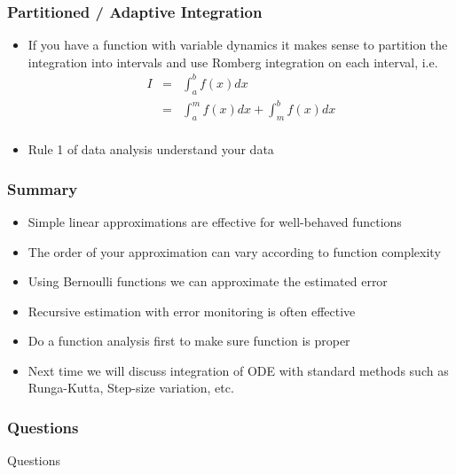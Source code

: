 \documentclass[10pt]{beamer}
\begin{document}
\begin{frame}
  \frametitle{Partitioned / Adaptive Integration}
  \begin{itemize}
  \item If you have a function with variable dynamics it makes sense
    to partition the integration into intervals and use Romberg
    integration on each interval, i.e.
    \[
      \begin{array}{rcl}
        I & = & \int_a^b f(x) dx \\
          & = & \int_a^m f(x) dx + \int_m^b f(x) dx\\
      \end{array}
    \]
  \item Rule 1 of data analysis understand your data     
  \end{itemize}
\end{frame}

\begin{frame}
  \frametitle{Summary}
  \begin{itemize}
  \item Simple linear approximations are effective for well-behaved functions
  \item The order of your approximation can vary according to function complexity
  \item Using Bernoulli functions we can approximate the estimated error
  \item Recursive estimation with error monitoring is often effective
  \item Do a function analysis first to make sure function is proper
  \item Next time we will discuss integration of ODE with standard
    methods such as Runga-Kutta, Step-size variation, etc.
  \end{itemize}
\end{frame}
\begin{frame}
  \frametitle{Questions}
  \centerline{\Huge Questions}
\end{frame}
\end{document}
